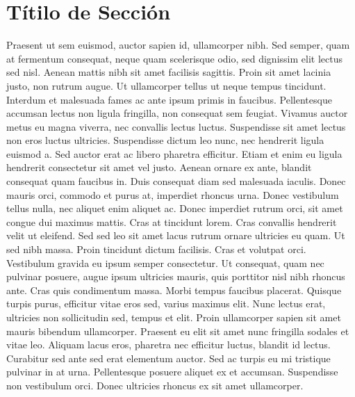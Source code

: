 \section{Títilo de Sección} 
Praesent ut sem euismod, auctor sapien id, ullamcorper nibh. Sed
semper, quam at fermentum consequat, neque quam scelerisque odio, sed dignissim
elit lectus sed nisl. Aenean mattis nibh sit amet facilisis sagittis. Proin sit
amet lacinia justo, non rutrum augue. Ut ullamcorper tellus ut neque tempus
tincidunt. Interdum et malesuada fames ac ante ipsum primis in faucibus.
Pellentesque accumsan lectus non ligula fringilla, non consequat sem feugiat.
Vivamus auctor metus eu magna viverra, nec convallis lectus luctus. Suspendisse
sit amet lectus non eros luctus ultricies. Suspendisse dictum leo nunc, nec
hendrerit ligula euismod a. Sed auctor erat ac libero pharetra efficitur. Etiam
et enim eu ligula hendrerit consectetur sit amet vel justo. Aenean ornare ex
ante, blandit consequat quam faucibus in. Duis consequat diam sed malesuada
iaculis. Donec mauris orci, commodo et purus at, imperdiet rhoncus urna. Donec
vestibulum tellus nulla, nec aliquet enim aliquet ac. Donec imperdiet rutrum
orci, sit amet congue dui maximus mattis. Cras at tincidunt lorem. Cras
convallis hendrerit velit ut eleifend. Sed sed leo sit amet lacus rutrum ornare
ultricies eu quam. Ut sed nibh massa. Proin tincidunt dictum facilisis. Cras et
volutpat orci. Vestibulum gravida eu ipsum semper consectetur. Ut consequat,
quam nec pulvinar posuere, augue ipsum ultricies mauris, quis porttitor nisl
nibh rhoncus ante. Cras quis condimentum massa. Morbi tempus faucibus placerat.
Quisque turpis purus, efficitur vitae eros sed, varius maximus elit. Nunc lectus
erat, ultricies non sollicitudin sed, tempus et elit. Proin ullamcorper sapien
sit amet mauris bibendum ullamcorper. Praesent eu elit sit amet nunc fringilla
sodales et vitae leo. Aliquam lacus eros, pharetra nec efficitur luctus, blandit
id lectus. Curabitur sed ante sed erat elementum auctor. Sed ac turpis eu mi
tristique pulvinar in at urna. Pellentesque posuere aliquet ex et accumsan.
Suspendisse non vestibulum orci. Donec ultricies rhoncus ex sit amet ullamcorper.
